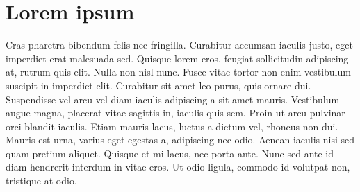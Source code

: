 \chapter{Lorem ipsum}
\label{section:appendix1}

Cras pharetra bibendum felis nec fringilla. Curabitur accumsan iaculis justo, eget imperdiet erat malesuada sed. Quisque lorem eros, feugiat sollicitudin adipiscing at, rutrum quis elit. Nulla non nisl nunc. Fusce vitae tortor non enim vestibulum suscipit in imperdiet elit. Curabitur sit amet leo purus, quis ornare dui. Suspendisse vel arcu vel diam iaculis adipiscing a sit amet mauris. Vestibulum augue magna, placerat vitae sagittis in, iaculis quis sem. Proin ut arcu pulvinar orci blandit iaculis. Etiam mauris lacus, luctus a dictum vel, rhoncus non dui. Mauris est urna, varius eget egestas a, adipiscing nec odio. Aenean iaculis nisi sed quam pretium aliquet. Quisque et mi lacus, nec porta ante. Nunc sed ante id diam hendrerit interdum in vitae eros. Ut odio ligula, commodo id volutpat non, tristique at odio.

